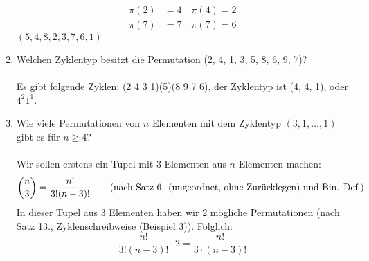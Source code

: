 \begin{enumerate}[label=(\alph*)]
\begin{align*}
        	\pi(2) &=4 \quad \pi(4)=2\\
        	\pi(7) &=7 \quad \pi(7)=6
        \end{align*}
        $(5, 4,8,2,3,7,6,1)$
        \item Welchen Zyklentyp besitzt die Permutation (2, 4, 1, 3, 5, 8, 6, 9, 7)?\\\\
        Es gibt folgende Zyklen: (2 4 3 1)(5)(8 9 7 6), der Zyklentyp ist (4, 4, 1), oder $4^2 1^1$.
        \item Wie viele Permutationen von $n$ Elementen mit dem Zyklentyp 
        $(3, 1, \ldots, 1)$ gibt es für $n \geq 4$?\\\\
        Wir sollen erstens ein Tupel mit 3 Elementen aus $n$ Elementen machen: 
        \[\binom{n}{3} = \frac{n!}{3!(n-3)!} 
        \textrm{\qquad(nach Satz 6. (ungeordnet, ohne Zur\"ucklegen) und Bin. Def.)}\]
        In dieser Tupel aus 3 Elementen haben wir 2 m\"ogliche Permutationen 
        (nach Satz 13., Zyklenschreibweise (Beispiel 3)). Folglich:
        \[\frac{n!}{3!(n-3)!} \cdot 2 = \frac{n!}{3\cdot(n-3)!}\]
    \end{enumerate}
